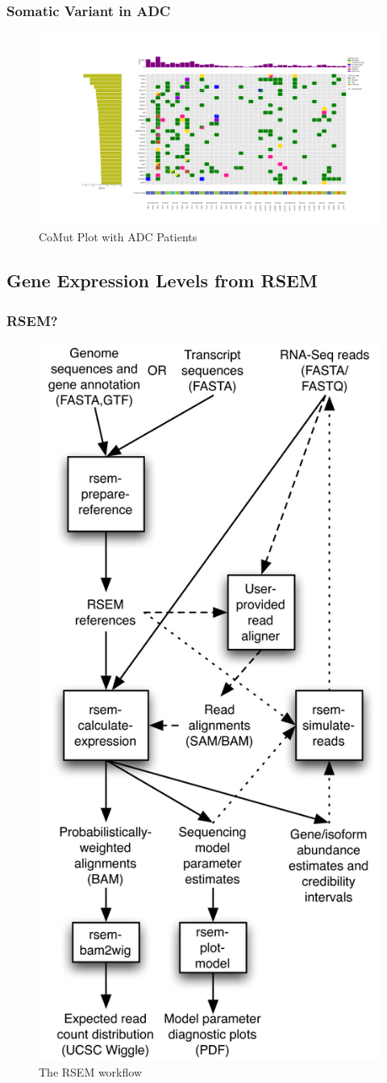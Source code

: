 \documentclass{beamer}
\begin{document}
    \begin{frame}
        \frametitle{Somatic Variant in ADC}

        \begin{figure}
            \includegraphics[width=\linewidth]{figures/Mutect2/Mutect2-ADC.pdf}
            \caption{CoMut Plot with ADC Patients}
        \end{figure}
    \end{frame}

    \subsection{Gene Expression Levels from RSEM}
    \begin{frame}
        \frametitle{RSEM?}

        \begin{figure}
            \includegraphics[width=0.2 \linewidth]{figures/Workflow/RSEM.jpg}
            \caption{The RSEM workflow \protect\cite{RSEM1}}
        \end{figure}
    \end{frame}
\end{document}
